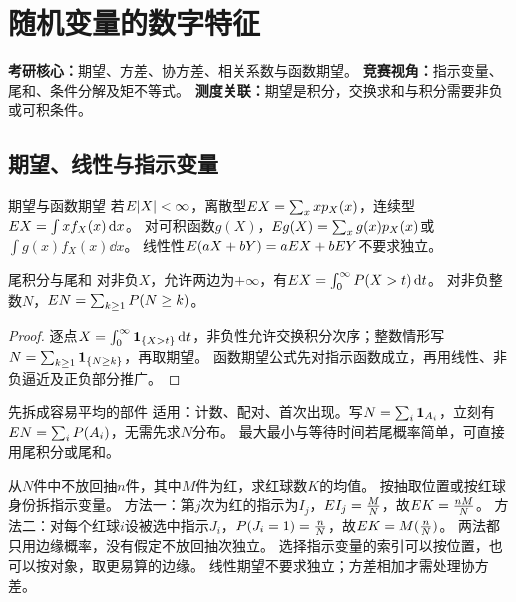 \chapter{随机变量的数字特征}\label{ch:04}
\begin{examtip}
\textbf{考研核心：}期望、方差、协方差、相关系数与函数期望。
\textbf{竞赛视角：}指示变量、尾和、条件分解及矩不等式。
\textbf{测度关联：}期望是积分，交换求和与积分需要非负或可积条件。
\end{examtip}
\section{期望、线性与指示变量}\label{sec:41}
\begin{definition}{期望与函数期望}
若$E|X|<\infty$，离散型$E X=\sum_xxp_X(x)$，连续型$E X=\int xf_X(x)\,\mathrm d x$。
对可积函数$g(X)$，$E g(X)=\sum_xg(x)p_X(x)$或$\int g(x)f_X(x)\dd x$。
线性性$E(aX+bY)=aE X+bE Y$不要求独立。
\end{definition}
\begin{theorem}{尾积分与尾和}
对非负$X$，允许两边为$+\infty$，有$E X=\int_0^\infty P(X>t)\,\mathrm d t$。
对非负整数$N$，$E N=\sum_{k\ge1}P(N\ge k)$。
\end{theorem}
\begin{proof}
逐点$X=\int_0^\infty\mathbf1_{\{X>t\}}\,\mathrm d t$，非负性允许交换积分次序；整数情形写$N=\sum_{k\ge1}\mathbf1_{\{N\ge k\}}$，再取期望。
函数期望公式先对指示函数成立，再用线性、非负逼近及正负部分推广。
\end{proof}
\begin{method}{先拆成容易平均的部件}
适用：计数、配对、首次出现。写$N=\sum_i\mathbf1_{A_i}$，立刻有$E N=\sum_iP(A_i)$，无需先求$N$分布。
最大最小与等待时间若尾概率简单，可直接用尾积分或尾和。
\end{method}
{从$N$件中不放回抽$n$件，其中$M$件为红，求红球数$K$的均值。}
{按抽取位置或按红球身份拆指示变量。}
{方法一：第$j$次为红的指示为$I_j$，$E I_j=\frac{M}{N}$，故$E K=\frac{nM}{N}$。
方法二：对每个红球$i$设被选中指示$J_i$，$P(J_i=1)=\frac{n}{N}$，故$E K=M(\frac{n}{N})$。
两法都只用边缘概率，没有假定不放回抽次独立。}
{选择指示变量的索引可以按位置，也可以按对象，取更易算的边缘。}
{线性期望不要求独立；方差相加才需处理协方差。}
